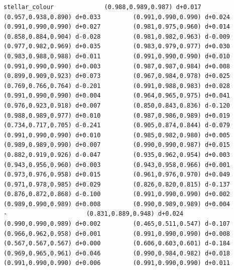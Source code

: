 \documentclass[11pt, letterpaper, openany]{book}
\begin{document}
\begin{empiricalbox}
\begin{lstlisting}[style=terminal]
stellar_colour              (0.988,0.989,0.987) d+0.017         (0.957,0.938,0.890) d+0.033         (0.991,0.990,0.990) d+0.024         (0.991,0.990,0.990) d+0.027         (0.981,0.975,0.960) d+0.014         (0.858,0.884,0.904) d-0.028         (0.981,0.982,0.963) d-0.009         (0.977,0.982,0.969) d+0.035         (0.983,0.979,0.977) d+0.030         (0.983,0.988,0.988) d+0.011         (0.991,0.990,0.990) d+0.010         (0.991,0.990,0.990) d+0.003         (0.987,0.987,0.984) d+0.008         (0.899,0.909,0.923) d+0.073         (0.967,0.984,0.978) d+0.025         (0.769,0.766,0.764) d-0.201         (0.991,0.988,0.983) d+0.028         (0.991,0.990,0.990) d+0.004         (0.964,0.965,0.975) d+0.041         (0.976,0.923,0.918) d+0.007         (0.850,0.843,0.836) d-0.120         (0.988,0.989,0.977) d+0.010         (0.987,0.986,0.989) d+0.019         (0.734,0.717,0.705) d-0.241         (0.905,0.874,0.844) d-0.079         (0.991,0.990,0.990) d+0.010         (0.985,0.982,0.980) d+0.005         (0.989,0.989,0.990) d+0.007         (0.990,0.990,0.987) d+0.015         (0.882,0.919,0.926) d-0.047         (0.935,0.962,0.954) d+0.003         (0.943,0.956,0.960) d+0.003         (0.943,0.958,0.966) d+0.001         (0.973,0.976,0.958) d+0.015         (0.961,0.976,0.970) d+0.049         (0.971,0.978,0.985) d+0.029         (0.826,0.820,0.815) d-0.137         (0.876,0.872,0.868) d-0.100         (0.991,0.990,0.990) d+0.002         (0.989,0.990,0.989) d+0.008         (0.990,0.989,0.989) d+0.004                      -                      (0.831,0.889,0.948) d+0.024         (0.990,0.990,0.989) d+0.002         (0.465,0.511,0.547) d-0.107         (0.966,0.962,0.958) d+0.001         (0.991,0.990,0.990) d+0.008         (0.567,0.567,0.567) d+0.000         (0.606,0.603,0.601) d-0.184         (0.969,0.965,0.961) d+0.046         (0.990,0.984,0.982) d+0.018         (0.991,0.990,0.990) d+0.006         (0.991,0.990,0.990) d+0.011     

\end{lstlisting}
\end{empiricalbox}
\end{document}
